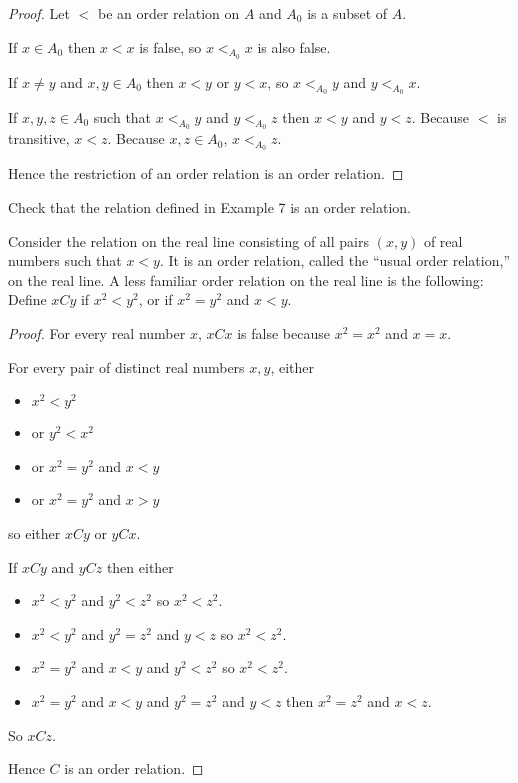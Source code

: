 \begin{proof}
    Let $<$ be an order relation on $A$ and $A_{0}$ is a subset of $A$.

    If $x\in A_{0}$ then $x < x$ is false, so $x <_{A_{0}} x$ is also false.

    If $x\ne y$ and $x, y\in A_{0}$ then $x < y$ or $y < x$, so $x <_{A_{0}} y$ and $y <_{A_{0}} x$.

    If $x, y, z\in A_{0}$ such that $x <_{A_{0}} y$ and $y <_{A_{0}} z$ then $x < y$ and $y < z$. Because $<$ is transitive, $x < z$. Because $x, z\in A_{0}$, $x <_{A_{0}} z$.

    Hence the restriction of an order relation is an order relation.
\end{proof}

\begin{exercise}\label{chapter1:section3:exercise8}
    Check that the relation defined in Example 7 is an order relation.

    Consider the relation on the real line consisting of all pairs $(x, y)$ of real
    numbers such that $x < y$. It is an order relation, called the ``usual order relation{,}'' on the real line. A less familiar order relation on the real line is the following: Define $xCy$ if $x^{2} < y^{2}$, or if $x^{2} = y^{2}$ and $x < y$.
\end{exercise}

\begin{proof}
    For every real number $x$, $xCx$ is false because $x^{2} = x^{2}$ and $x = x$.

    For every pair of distinct real numbers $x, y$, either
    \begin{itemize}[itemsep=0pt]
        \item $x^{2} < y^{2}$
        \item or $y^{2} < x^{2}$
        \item or $x^{2} = y^{2}$ and $x < y$
        \item or $x^{2} = y^{2}$ and $x > y$
    \end{itemize}

    so either $xCy$ or $yCx$.

    If $xCy$ and $yCz$ then either
    \begin{itemize}[itemsep=0pt]
        \item $x^{2} < y^{2}$ and $y^{2} < z^{2}$ so $x^{2} < z^{2}$.
        \item $x^{2} < y^{2}$ and $y^{2} = z^{2}$ and $y < z$ so $x^{2} < z^{2}$.
        \item $x^{2} = y^{2}$ and $x < y$ and $y^{2} < z^{2}$ so $x^{2} < z^{2}$.
        \item $x^{2} = y^{2}$ and $x < y$ and $y^{2} = z^{2}$ and $y < z$ then $x^{2} = z^{2}$ and $x < z$.
    \end{itemize}

    So $xCz$.

    Hence $C$ is an order relation.
\end{proof}


